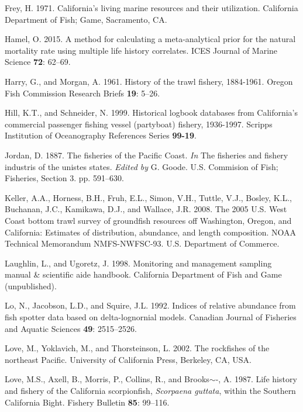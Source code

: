 \documentclass[12pt,]{article}
\begin{document}
\hypertarget{ref-Frey1971}{}
Frey, H. 1971. California's living marine resources and their
utilization. California Department of Fish; Game, Sacramento, CA.

\hypertarget{ref-Hamel2015}{}
Hamel, O. 2015. A method for calculating a meta-analytical prior for the
natural mortality rate using multiple life history correlates. ICES
Journal of Marine Science \textbf{72}: 62--69.

\hypertarget{ref-Harry1961}{}
Harry, G., and Morgan, A. 1961. History of the trawl fishery, 1884-1961.
Oregon Fish Commission Research Briefs \textbf{19}: 5--26.

\hypertarget{ref-Hill1999}{}
Hill, K.T., and Schneider, N. 1999. Historical logbook databases from
California's commercial passenger fishing vessel (partyboat) fishery,
1936-1997. Scripps Institution of Oceanography References Series
\textbf{99-19}.

\hypertarget{ref-Jordan1887}{}
Jordan, D. 1887. The fisheries of the Pacific Coast. \emph{In} The
fisheries and fishery industris of the unistes states. \emph{Edited by}
G. Goode. U.S. Commision of Fish; Fisheries, Section 3. pp. 591--630.

\hypertarget{ref-Keller2008}{}
Keller, A.A., Horness, B.H., Fruh, E.L., Simon, V.H., Tuttle, V.J.,
Bosley, K.L., Buchanan, J.C., Kamikawa, D.J., and Wallace, J.R. 2008.
The 2005 U.S. West Coast bottom trawl survey of groundfish resources off
Washington, Oregon, and California: Estimates of distribution,
abundance, and length composition. NOAA Technical Memorandum
NMFS-NWFSC-93. U.S. Department of Commerce.

\hypertarget{ref-Laughlin1998}{}
Laughlin, L., and Ugoretz, J. 1998. Monitoring and management sampling
manual \& scientific aide handbook. California Department of Fish and
Game (unpublished).

\hypertarget{ref-Lo1992}{}
Lo, N., Jacobson, L.D., and Squire, J.L. 1992. Indices of relative
abundance from fish spotter data based on delta-lognornial models.
Canadian Journal of Fisheries and Aquatic Sciences \textbf{49}:
2515--2526.

\hypertarget{ref-Love2002}{}
Love, M., Yoklavich, M., and Thorsteinson, L. 2002. The rockfishes of
the northeast Pacific. University of California Press, Berkeley, CA,
USA.

\hypertarget{ref-Love1987}{}
Love, M.S., Axell, B., Morris, P., Collins, R., and Brooks\(\sim\)-, A.
1987. Life history and fishery of the California scorpionfish,
\emph{Scorpaena guttata}, within the Southern California Bight. Fishery
Bulletin \textbf{85}: 99--116.
\end{document}
